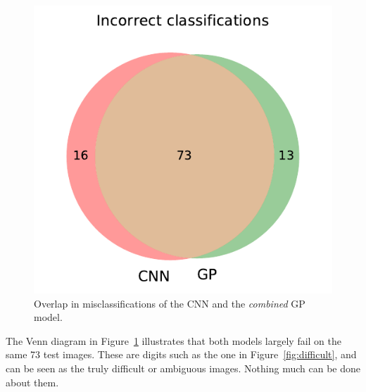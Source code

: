 \documentclass{article}
\begin{document}
\begin{figure}[h]
\centering
\includegraphics[scale=0.50]{figures/mnist/venn-Linear-Matern32-Kernel-GP.pdf}
\caption{Overlap in misclassifications of the CNN and the \textit{combined} GP model.}
\label{fig:venn}
\end{figure}

The Venn diagram in Figure~\ref{fig:venn} illustrates that both models largely fail on the same 73 test images. These are digits such as the one in Figure~\ref{fig:difficult}, and can be seen as the truly difficult or ambiguous images. Nothing much can be done about them.
\end{document}
